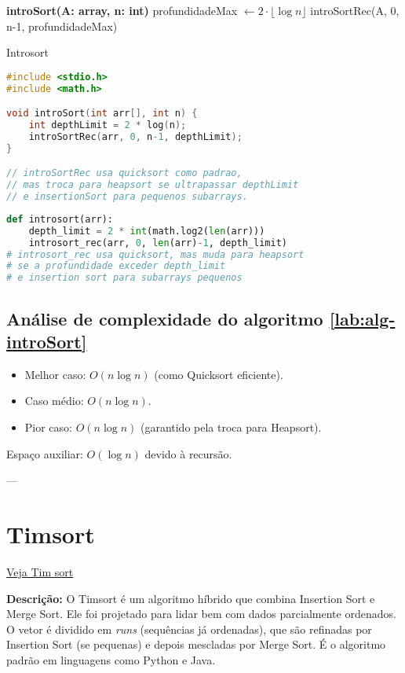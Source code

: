 \begin{algorithm}[H]
\DontPrintSemicolon
\textbf{introSort(A: array, n: int)}\;
profundidadeMax $\gets 2 \cdot \lfloor \log n \rfloor$\;
introSortRec(A, 0, n-1, profundidadeMax)\;
\caption{Introsort}
\label{lab:alg-introSort}
\end{algorithm}

\begin{lstlisting}[language=C, caption={Estrutura simplificada do Introsort em C}, label=code:introSort]
#include <stdio.h>
#include <math.h>

void introSort(int arr[], int n) {
    int depthLimit = 2 * log(n);
    introSortRec(arr, 0, n-1, depthLimit);
}

// introSortRec usa quicksort como padrao,
// mas troca para heapsort se ultrapassar depthLimit
// e insertionSort para pequenos subarrays.
\end{lstlisting}

\begin{lstlisting}[language=Python, caption={Estrutura simplificada do Introsort em Python}, label=code:introSortPy]
def introsort(arr):
    depth_limit = 2 * int(math.log2(len(arr)))
    introsort_rec(arr, 0, len(arr)-1, depth_limit)
# introsort_rec usa quicksort, mas muda para heapsort
# se a profundidade exceder depth_limit
# e insertion sort para subarrays pequenos
\end{lstlisting}

\subsection{Análise de complexidade do algoritmo \ref{lab:alg-introSort}}
\begin{itemize}
    \item Melhor caso: $O(n \log n)$ (como Quicksort eficiente).
    \item Caso médio: $O(n \log n)$.
    \item Pior caso: $O(n \log n)$ (garantido pela troca para Heapsort).
\end{itemize}
Espaço auxiliar: $O(\log n)$ devido à recursão.

---


\section{Timsort}

\href{https://www.algowalker.com/tim-sort.html}{Veja Tim sort}

\textbf{Descrição:} O Timsort é um algoritmo híbrido que combina Insertion Sort e Merge Sort. Ele foi projetado para lidar bem com dados parcialmente ordenados. O vetor é dividido em \textit{runs} (sequências já ordenadas), que são refinadas por Insertion Sort (se pequenas) e depois mescladas por Merge Sort. É o algoritmo padrão em linguagens como Python e Java.

